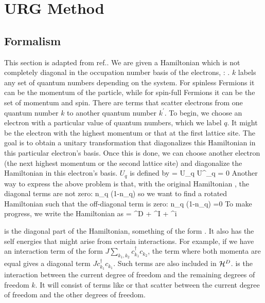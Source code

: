 \documentclass[14pt]{extarticle}
\numberwithin{equation}{section}
\begin{document}
\section{URG Method}\label{section2}
\subsection{Formalism}
This section is adapted from ref.\cite{holography1}.
We are given a Hamiltonian \il{\ham} which is not completely diagonal in the occupation number basis of the electrons, : . \(k\) labels any set of quantum numbers depending on the system. For spinless Fermions it can be the momentum of the particle, while for spin-full Fermions it can be the set of momentum and spin. There are terms that scatter electrons from one quantum number \(k\) to another quantum number \(k^\prime\).
\pb To begin, we choose an electron with a particular value of quantum numbers, which we label \(q\). It might be the electron with the highest momentum or that at the first lattice site. The goal is to obtain a unitary transformation  that diagonalizes this Hamiltonian in this particular electron's basis. Once this is done, we can choose another electron (the next highest momentum or the second lattice site) and diagonalize the Hamiltonian in this electron's basis.
\pb \(U_q\) is defined by
\beq
\tilde \ham = U_q \ham U^\dagger_q   = 0
\eeq
Another way to express the above problem is that, with the original Hamiltonian \il{\ham}, the diagonal terms are not zero:
\beq
n_q \ham(1-n_q) 
\eeq
so we want to find a rotated Hamiltonian  such that the off-diagonal term is zero:
\beq[solve]
n_q \tilde \ham(1-n_q) =0
\eeq
To make progress, we write the Hamiltonian \il{\ham} as
\beq[ham]
\ham = \ham^D + \ham^I + \ham^i 
\eeq
\begin{minipage}{310pt}
	 is the diagonal part of the Hamiltonian, something of the form .
It also has the self energies that might arise from certain interactions.
For example, if we have an interaction term of the form \(J \sum_{k_1,k_2}c^\dagger_{k_1}c_{k_2}\), the term where both momenta are equal gives a diagonal term \(J c^\dagger_{k_1}c_{k_1}\).
Such terms are also included in \(\mathcal{H}^D\).
\pb {} is the interaction between the current degree of freedom  and the remaining degrees of freedom \(k\).
It will consist of terms like  or  that scatter between the current degree of freedom and the other degrees of freedom.
\end{minipage}
\end{document}
